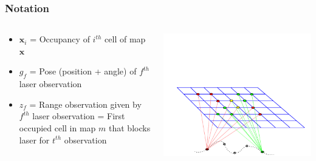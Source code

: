 \documentclass{beamer}
\newcommand{\vect}[1]{\mathbf{#1}}
\newcommand{\map}{\vect{x}}
\newcommand{\meas}{z}
\newcommand{\pose}{g}
\begin{document}
\begin{frame}
\frametitle{Notation}

\begin{columns}
  \begin{column}{0.7\textwidth}
    \begin{itemize}
      \item $\map_i$ = Occupancy of $i^{th}$ cell of map $\map$
      \item $\pose_f$ = Pose (position + angle) of $f^{th}$ laser observation
      \item $\meas_f$ = Range observation given by $f^{th}$ laser observation
        = First occupied cell in map $m$ that blocks laser for $t^{th}$ observation
    \end{itemize}
  \end{column}
  \begin{column}{0.3\textwidth}
    \includegraphics[trim=0in 0in 0in 2in, width=\textwidth]{figures/factorgraph/fg3.pdf}
  \end{column}
\end{columns}
\end{frame}
\end{document}
